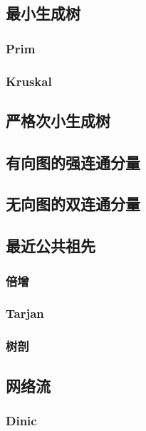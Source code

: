 \documentclass[12pt,a4paper]{article}
\begin{document}
\subsection{最小生成树}
\subsubsection{Prim}

\subsubsection{Kruskal}

\subsection{严格次小生成树}

\subsection{有向图的强连通分量}
\subsection{无向图的双连通分量}
\subsection{最近公共祖先}
\subsubsection{倍增}

\subsubsection{Tarjan}

\subsubsection{树剖}

\subsection{网络流}
\subsubsection{Dinic}
\begin{spacing}{1.5}

\end{spacing}

\end{document}
